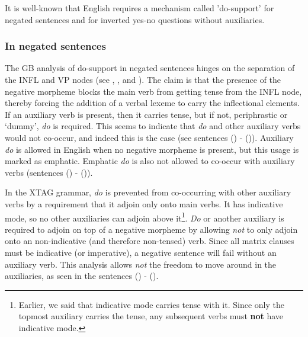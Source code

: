 It is well-known that English requires a mechanism called 'do-support' for
negated sentences and for inverted yes-no questions without auxiliaries.


\subsubsection{In negated sentences}
\label{do-support-negatives}

The GB analysis of do-support in negated sentences hinges on the separation of
the INFL and VP nodes (see \cite{chomsky65}, \cite{jackendoff72}, and
\cite{chomsky86}).  The claim is that the presence of the negative morpheme
blocks the main verb from getting tense from the INFL node, thereby forcing the
addition of a verbal lexeme to carry the inflectional elements.  If an
auxiliary verb is present, then it carries tense, but if not, periphrastic or
`dummy', {\it do} is required.  This seems to indicate that {\it do} and other
auxiliary verbs would not co-occur, and indeed this is the case (see sentences
() - ()).  Auxiliary {\it do} is allowed in English when no
negative morpheme is present, but this usage is marked as emphatic.  Emphatic
{\it do} is also not allowed to co-occur with auxiliary verbs (sentences
() - ()).


In the XTAG grammar, {\it do} is prevented from co-occurring with other
auxiliary verbs by a requirement that it adjoin only onto main verbs.  It has
indicative mode, so no other auxiliaries can adjoin above it\footnote{Earlier,
we said that indicative mode carries tense with it.  Since only the topmost
auxiliary carries the tense, any subsequent verbs must {\bf not} have
indicative mode.}.  {\it Do} or another auxiliary is required to adjoin on top
of a negative morpheme by allowing {\it not} to only adjoin onto an
non-indicative (and therefore non-tensed) verb.  Since all matrix clauses must
be indicative (or imperative), a negative sentence will fail without an
auxiliary verb.  This analysis allows {\it not} the freedom to move around in
the auxiliaries, as seen in the sentences () - ().

